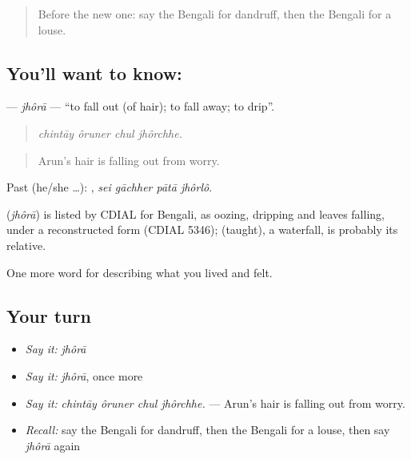 \label{lesson:BN-C470-jhora}



\begin{quote}
Before the new one: say the Bengali for dandruff, then the Bengali for a louse.
\end{quote}

\subsection*{You'll want to know: }
\textbf{} — \emph{jhôrā} — \textquotedblleft{}to fall out (of hair); to fall away; to drip\textquotedblright{}.

\begin{quote}
   
\end{quote}

\begin{quote}
\emph{chintāy ôruner chul jhôrchhe.}
\end{quote}

\begin{quote}
Arun's hair is falling out from worry.
\end{quote}

Past (he/she …):    , \emph{sei gāchher pātā jhôrlô}.

\begin{cousinweb}
\textbf{} (\emph{jhôrā}) is listed by CDIAL for Bengali, as oozing, dripping and leaves falling, under a reconstructed form (CDIAL 5346);  (taught), a waterfall, is probably its relative.
\end{cousinweb}

\begin{grammarlens}[title={What you've built}]
One more word for describing what you lived and felt.
\end{grammarlens}

\subsection*{Your turn}
\begin{itemize}
\raggedright
  \item \emph{Say it:} \emph{jhôrā}
  \item \emph{Say it:} \emph{jhôrā}, once more
  \item \emph{Say it:} \emph{chintāy ôruner chul jhôrchhe.} — Arun's hair is falling out from worry.
  \item \emph{Recall:} say the Bengali for dandruff, then the Bengali for a louse, then say \emph{jhôrā} again
\end{itemize}

